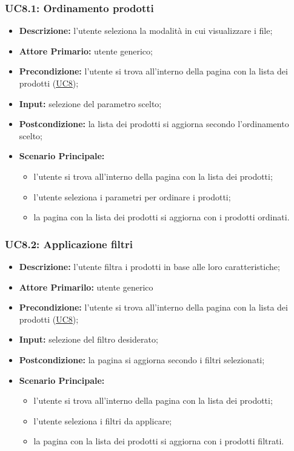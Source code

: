 \subsubsection{UC8.1: Ordinamento prodotti}
\label{sec:UC8.1}
\begin{itemize}
    \item \textbf{Descrizione:} l'utente seleziona la modalità in cui visualizzare i file;
    \item \textbf{Attore Primario:} utente generico;
    \item \textbf{Precondizione:} l'utente si trova all'interno della pagina con la lista dei prodotti (\hyperref[sec:UC8]{\underline{UC8}});
    \item \textbf{Input:} selezione del parametro scelto;
    \item \textbf{Postcondizione:} la lista dei prodotti si aggiorna secondo l'ordinamento scelto;
    \item \textbf{Scenario Principale:}
          \begin{itemize}
              \item l'utente si trova all'interno della pagina con la lista dei prodotti;
              \item l'utente seleziona i parametri per ordinare i prodotti;
              \item la pagina con la lista dei prodotti si aggiorna con i prodotti ordinati.
          \end{itemize}
\end{itemize}
\subsubsection{UC8.2: Applicazione filtri}
\label{sec:UC8.2}
\begin{itemize}
    \item \textbf{Descrizione:} l'utente filtra i prodotti in base alle loro caratteristiche;
    \item \textbf{Attore Primarilo:} utente generico
    \item \textbf{Precondizione:} l'utente si trova all'interno della pagina con la lista dei prodotti (\hyperref[sec:UC8]{\underline{UC8}});
    \item \textbf{Input:} selezione del filtro desiderato;
    \item \textbf{Postcondizione:} la pagina si aggiorna secondo i filtri selezionati;
    \item \textbf{Scenario Principale:}
          \begin{itemize}
              \item l'utente si trova all'interno della pagina con la lista dei prodotti;
              \item l'utente seleziona i filtri da applicare;
              \item la pagina con la lista dei prodotti si aggiorna con i prodotti filtrati.
          \end{itemize}
\end{itemize}